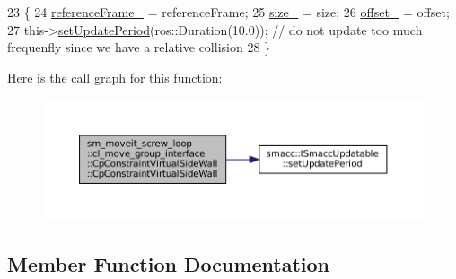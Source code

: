 \begin{DoxyCode}
23         \{
24             \hyperlink{classsm__moveit__screw__loop_1_1cl__move__group__interface_1_1CpConstraintVirtualSideWall_a26e5b811c2b96eff63de1a0e8f6d7123}{referenceFrame\_} = referenceFrame;
25             \hyperlink{classsm__moveit__screw__loop_1_1cl__move__group__interface_1_1CpConstraintVirtualSideWall_a8426348ea8e4b58a66677f971355a87b}{size\_} = size;
26             \hyperlink{classsm__moveit__screw__loop_1_1cl__move__group__interface_1_1CpConstraintVirtualSideWall_a3ba336712454339510d0fb6804ff2a16}{offset\_} = offset;
27             this->\hyperlink{classsmacc_1_1ISmaccUpdatable_a88f3b092a81b2d8810a9776c8c69855b}{setUpdatePeriod}(ros::Duration(10.0)); \textcolor{comment}{// do not update too much frequenfly
       since we have a relative collision}
28         \}
\end{DoxyCode}
Here is the call graph for this function\+:
\nopagebreak
\begin{figure}[H]
\begin{center}
\leavevmode
\includegraphics[width=350pt]{classsm__moveit__screw__loop_1_1cl__move__group__interface_1_1CpConstraintVirtualSideWall_a45494669c8fbc0480e4643de03b9dea4_cgraph}
\end{center}
\end{figure}


\subsection{Member Function Documentation}
\mbox{\label{classsm__moveit__screw__loop_1_1cl__move__group__interface_1_1CpConstraintVirtualSideWall_a4f5a69da36fc2a882d0b36466b72452b}} 
